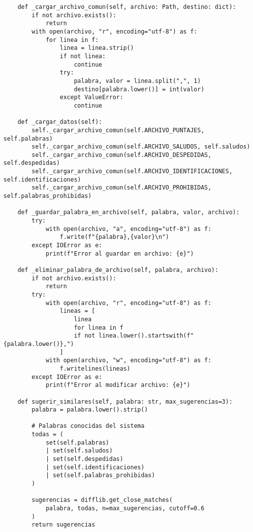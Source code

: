 \begin{lstlisting}
    def _cargar_archivo_comun(self, archivo: Path, destino: dict):
        if not archivo.exists():
            return
        with open(archivo, "r", encoding="utf-8") as f:
            for linea in f:
                linea = linea.strip()
                if not linea:
                    continue
                try:
                    palabra, valor = linea.split(",", 1)
                    destino[palabra.lower()] = int(valor)
                except ValueError:
                    continue

    def _cargar_datos(self):
        self._cargar_archivo_comun(self.ARCHIVO_PUNTAJES, self.palabras)
        self._cargar_archivo_comun(self.ARCHIVO_SALUDOS, self.saludos)
        self._cargar_archivo_comun(self.ARCHIVO_DESPEDIDAS, self.despedidas)
        self._cargar_archivo_comun(self.ARCHIVO_IDENTIFICACIONES, self.identificaciones)
        self._cargar_archivo_comun(self.ARCHIVO_PROHIBIDAS, self.palabras_prohibidas)

    def _guardar_palabra_en_archivo(self, palabra, valor, archivo):
        try:
            with open(archivo, "a", encoding="utf-8") as f:
                f.write(f"{palabra},{valor}\n")
        except IOError as e:
            print(f"Error al guardar en archivo: {e}")

    def _eliminar_palabra_de_archivo(self, palabra, archivo):
        if not archivo.exists():
            return
        try:
            with open(archivo, "r", encoding="utf-8") as f:
                lineas = [
                    linea
                    for linea in f
                    if not linea.lower().startswith(f"{palabra.lower()},")
                ]
            with open(archivo, "w", encoding="utf-8") as f:
                f.writelines(lineas)
        except IOError as e:
            print(f"Error al modificar archivo: {e}")

    def sugerir_similares(self, palabra: str, max_sugerencias=3):
        palabra = palabra.lower().strip()

        # Palabras conocidas del sistema
        todas = (
            set(self.palabras)
            | set(self.saludos)
            | set(self.despedidas)
            | set(self.identificaciones)
            | set(self.palabras_prohibidas)
        )

        sugerencias = difflib.get_close_matches(
            palabra, todas, n=max_sugerencias, cutoff=0.6
        )
        return sugerencias
\end{lstlisting}

